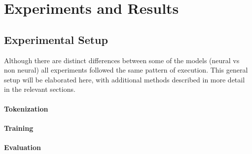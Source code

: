 \chapter{Experiments and Results}
\label{experiments_and_results}


\section{Experimental Setup} %
\label{sec:experimental_setup}

Although there are distinct differences between some of the models (neural vs non neural) all experiments followed the same pattern of execution.
This general setup will be elaborated here, with additional methods described in more detail in the relevant sections.


\subsubsection{Tokenization} %
\label{ssub:tokenization}

\subsubsection{Training} %
\label{ssub:training}

\subsubsection{Evaluation} %
\label{ssub:evaluation}




